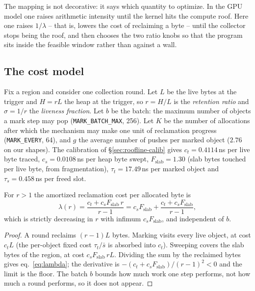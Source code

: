 The mapping is not decorative: it says which quantity to optimize.
In the GPU model one raises arithmetic intensity until the kernel hits the compute roof.
Here one raises $1/\lambda$ -- that is, lowers the cost of reclaiming a byte -- until the collector
stops being the roof, and then chooses the two ratio knobs so that the program sits inside the
feasible window rather than against a wall.

\subsection{The cost model}
\label{sec:roofline-cost}

Fix a region and consider one collection round.
Let $L$ be the live bytes at the trigger and $H = rL$ the heap at the trigger, so $r = H/L$ is the
\emph{retention ratio} and $\sigma = 1/r$ the \emph{liveness fraction}.
Let $b$ be the batch: the maximum number of objects a mark step may pop
(\texttt{MARK\_BATCH\_MAX}, 256).
Let $K$ be the number of allocations after which the mechanism may make one unit of reclamation
progress (\texttt{MARK\_EVERY}, 64), and $g$ the average number of pushes per marked object ($2.76$
on our shapes).
The calibration of \S\ref{sec:roofline-calib} gives $c_t = 0.4114$\,ns per live byte traced,
$c_s = 0.0108$\,ns per heap byte swept, $F_{\text{slab}} = 1.30$ (slab bytes touched per live byte,
from fragmentation), $\tau_t = 17.49$\,ns per marked object and $\tau_s = 0.458$\,ns per freed slot.

\begin{theorem}
\label{thm:cost}
For $r > 1$ the amortized reclamation cost per allocated byte is
\begin{equation}
\label{eq:lambda}
\lambda(r) = \frac{c_t + c_s F_{\text{slab}}\, r}{r - 1}
= c_s F_{\text{slab}} + \frac{c_t + c_s F_{\text{slab}}}{r-1},
\end{equation}
which is strictly decreasing in $r$ with infimum $c_s F_{\text{slab}}$, and independent of $b$.
\end{theorem}
\begin{proof}
A round reclaims $(r-1)L$ bytes.
Marking visits every live object, at cost $c_t L$ (the per-object fixed cost $\tau_t/\bar{s}$ is
absorbed into $c_t$).
Sweeping covers the slab bytes of the region, at cost $c_s F_{\text{slab}}\, rL$.
Dividing the sum by the reclaimed bytes gives eq.~\ref{eq:lambda}; the derivative is
$-(c_t + c_s F_{\text{slab}})/(r-1)^2 < 0$ and the limit is the floor.
The batch $b$ bounds how much work one step performs, not how much a round performs, so it does not
appear.
\end{proof}

